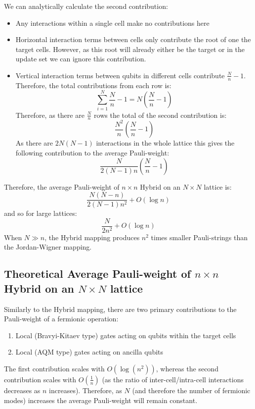 We can analytically calculate the second contribution:
\begin{itemize}
    \item Any interactions within a single cell make no contributions here
    \item Horizontal interaction terms between cells only contribute the root of one the target cells. However, as this root will already either be the target or in the update set we can ignore this contribution.
    \item Vertical interaction terms between qubits in different cells contribute $\frac{N}{n} -1$. Therefore, the total contributions from each row is:
    \begin{equation}
            \sum_{i=1}^{N} \frac{N}{n} -1 = N\left(\frac{N}{n} -1\right)
    \end{equation}
    Therefore, as there are $\frac{N}{n}$ rows the total of the second contribution is:
    \begin{equation}
        \frac{N^2}{n}\left(\frac{N}{n}-1\right)
    \end{equation}
    As there are $2N(N - 1)$ interactions in the whole lattice this gives the following contribution to the average Pauli-weight:
    \begin{equation}
        \frac{N}{2(N-1)n}\left(\frac{N}{n}-1\right)
    \end{equation}
\end{itemize}
Therefore, the average Pauli-weight of $n\times n$ Hybrid on an $N\times N$ lattice is:
\begin{equation}
        \frac{N(N-n)}{2(N-1)n^2} + O(\log n) 
\end{equation}
and so for large lattices:
\begin{equation}
        \frac{N}{2n^2} + O(\log n) 
\end{equation}
When $N\gg n$, the Hybrid mapping produces $n^2$ times smaller Pauli-strings than the Jordan-Wigner mapping.
\subsection{Theoretical Average Pauli-weight of $n\times n$ Hybrid\+ on an $N\times N$ lattice}
Similarly to the Hybrid mapping, there are two primary contributions to the Pauli-weight of a fermionic operation:
\begin{enumerate}
    \item Local (Bravyi-Kitaev type) gates acting on qubits within the target cells
    \item Local (AQM type) gates acting on ancilla qubits
\end{enumerate}
The first contribution scales with $O(\log(n^2))$, whereas the second contribution scales with $O(\frac{1}{n})$ (as the ratio of inter-cell/intra-cell interactions decreases as $n$ increases). Therefore, as $N$ (and therefore the number of fermionic modes) increases the average Pauli-weight will remain constant.

